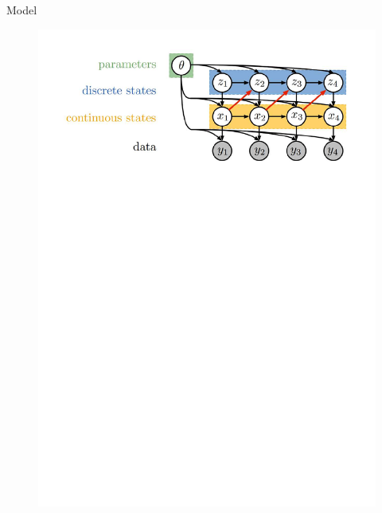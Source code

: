 \documentclass{beamer}
\begin{document}
\begin{frame}{Model}
\begin{figure}
	\centering
    \includegraphics[width=1.0\linewidth]{gallery/rSLDS.pdf}
\end{figure}



    \end{frame}
\end{document}
